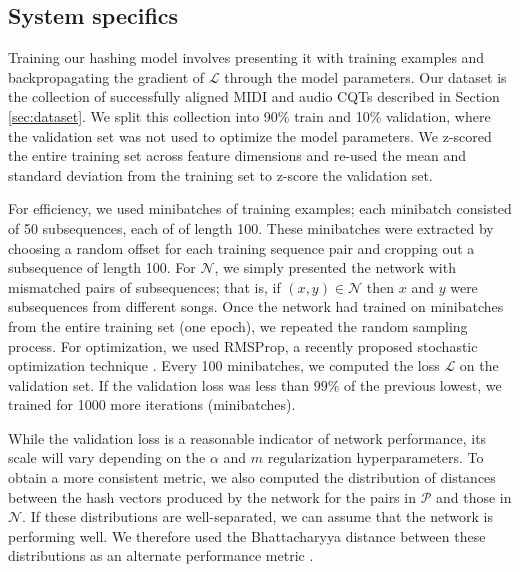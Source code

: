 \documentclass{article}
\begin{document}
\subsection{System specifics}

Training our hashing model involves presenting it with training examples and backpropagating the gradient of $\mathcal{L}$ through the model parameters.
Our dataset is the collection of successfully aligned MIDI and audio CQTs described in Section \ref{sec:dataset}.
We split this collection into 90\% train and 10\% validation, where the validation set was not used to optimize the model parameters.
We z-scored the entire training set across feature dimensions and re-used the mean and standard deviation from the training set to z-score the validation set.

For efficiency, we used minibatches of training examples; each minibatch consisted of 50 subsequences, each of of length 100.
These minibatches were extracted by choosing a random offset for each training sequence pair and cropping out a subsequence of length 100.
For $\mathcal{N}$, we simply presented the network with mismatched pairs of subsequences; that is, if $(x, y) \in \mathcal{N}$ then $x$ and $y$ were subsequences from different songs.
Once the network had trained on minibatches from the entire training set (one epoch), we repeated the random sampling process. 
For optimization, we used RMSProp, a recently proposed stochastic optimization technique \cite{tieleman2012lecture}.
Every 100 minibatches, we computed the loss $\mathcal{L}$ on the validation set.
If the validation loss was less than $99\%$ of the previous lowest, we trained for 1000 more iterations (minibatches).

While the validation loss is a reasonable indicator of network performance, its scale will vary depending on the $\alpha$ and $m$ regularization hyperparameters.
To obtain a more consistent metric, we also computed the distribution of distances between the hash vectors produced by the network for the pairs in $\mathcal{P}$ and those in $\mathcal{N}$.
If these distributions are well-separated, we can assume that the network is performing well.
We therefore used the Bhattacharyya distance between these distributions as an alternate performance metric \cite{bhattacharyya1943measure}.
\end{document}
